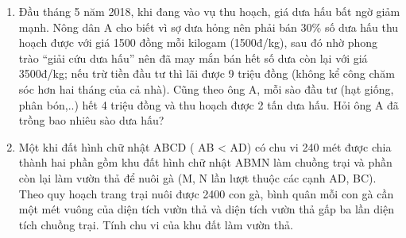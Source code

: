 \begin{ex}%
	\begin{enumerate}
		\item Đầu tháng 5 năm 2018, khi đang vào vụ thu hoạch, giá dưa hấu bất ngờ giảm mạnh. Nông dân A cho biết vì sợ dưa hỏng nên phải bán 30\% số dưa hấu thu hoạch được với giá 1500 đồng mỗi kilogam (1500đ/kg), sau đó nhờ phong trào “giải cứu dưa hấu” nên đã may mắn bán hết số dưa còn lại với giá 3500đ/kg; nếu trừ tiền đầu tư thì lãi được 9 triệu đồng (không kể công chăm sóc hơn hai tháng của cả nhà). Cũng theo ông A, mỗi sào đầu tư (hạt giống, phân bón,..) hết 4 triệu đồng và thu hoạch được 2 tấn dưa hấu. Hỏi ông A đã trồng bao nhiêu sào dưa hấu?
		\item Một khi đất hình chữ nhật ABCD ( AB < AD) có chu vi 240 mét được chia thành hai phần gồm khu đất hình chữ nhật ABMN làm chuồng trại và phần còn lại làm vườn thả để nuôi gà (M, N lần lượt thuộc các cạnh AD, BC). Theo quy hoạch trang trại nuôi được 2400 con gà, bình quân mỗi con gà cần một mét vuông của diện tích vườn thả và diện tích vườn thả gấp ba lần diện tích chuồng trại. Tính chu vi của khu đất làm vườn thả.
	\end{enumerate}
\end{ex}
